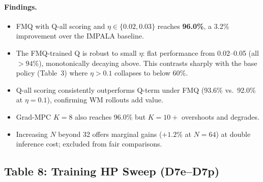 \documentclass[11pt]{article}
\begin{document}
\paragraph{Findings.}
\begin{itemize}
\item FMQ with Q-all scoring and $\eta \in \{0.02, 0.03\}$ reaches \textbf{96.0\%}, a 3.2\%
      improvement over the IMPALA baseline.
\item The FMQ-trained Q is robust to small $\eta$: flat performance from 0.02--0.05
      (all $>94\%$), monotonically decaying above. This contrasts sharply with the base
      policy (Table~3) where $\eta>0.1$ collapses to below 60\%.
\item Q-all scoring consistently outperforms Q-term under FMQ
      (93.6\% vs.\ 92.0\% at $\eta=0.1$), confirming WM rollouts add value.
\item Grad-MPC $K=8$ also reaches 96.0\% but $K=10+$ overshoots and degrades.
\item Increasing $N$ beyond 32 offers marginal gains ($+1.2\%$ at $N=64$) at double
      inference cost; excluded from fair comparisons.
\end{itemize}

\subsection*{Table 8: Training HP Sweep (D7e--D7p)}
\end{document}
